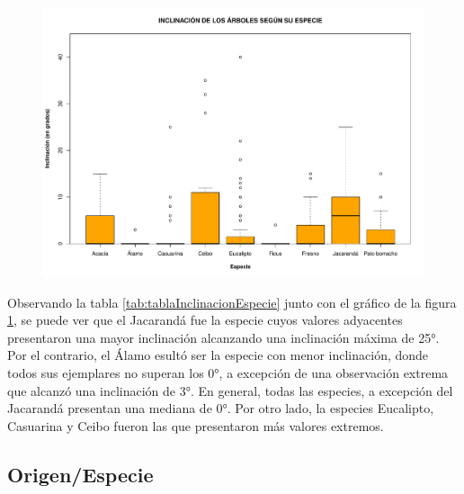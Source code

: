 \documentclass[11pt]{article}
\begin{document}
\begin{figure}[h!]
  \begin{center}
    \includegraphics[width=0.9\linewidth]{boxInclinacionEspecie.pdf}
    \caption{}
    \label{fig:boxInclinacionEspecie}
  \end{center}
\end{figure}

\begin{justify}
  Observando la tabla \ref{tab:tablaInclinacionEspecie} junto con el
  gráfico de la figura \ref{fig:boxInclinacionEspecie}, se puede ver que el
  Jacarandá fue la especie cuyos valores adyacentes presentaron una mayor inclinación
   alcanzando una inclinación máxima de 25°. Por el contrario, el Álamo 
   esultó ser la especie con menor inclinación, donde todos sus ejemplares no superan los 0°,
  a excepción de una observación extrema que alcanzó una inclinación de 3°.
  En general, todas las especies, a excepción del Jacarandá presentan una mediana
  de 0°. Por otro lado, la especies Eucalipto, Casuarina y Ceibo fueron las que
  presentaron más valores extremos.
\end{justify}


\subsection{Origen/Especie}
\end{document}
